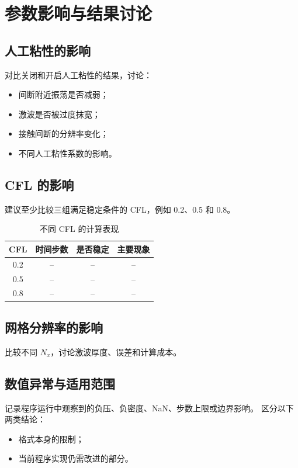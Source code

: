 \section{参数影响与结果讨论}

\subsection{人工粘性的影响}

对比关闭和开启人工粘性的结果，讨论：

\begin{itemize}[leftmargin=2em]
    \item 间断附近振荡是否减弱；
    \item 激波是否被过度抹宽；
    \item 接触间断的分辨率变化；
    \item 不同人工粘性系数的影响。
\end{itemize}


\subsection{CFL 的影响}

建议至少比较三组满足稳定条件的 CFL，例如 0.2、0.5 和 0.8。

\begin{table}[H]
    \centering
    \caption{不同 CFL 的计算表现}
    \label{tab:cfl}
    \begin{tabular}{cccc}
        \toprule
        CFL & 时间步数 & 是否稳定 & 主要现象\\
        \midrule
        0.2 & -- & -- & --\\
        0.5 & -- & -- & --\\
        0.8 & -- & -- & --\\
        \bottomrule
    \end{tabular}
\end{table}

\subsection{网格分辨率的影响}

比较不同 $N_x$，讨论激波厚度、误差和计算成本。


\subsection{数值异常与适用范围}

记录程序运行中观察到的负压、负密度、NaN、步数上限或边界影响。
区分以下两类结论：

\begin{itemize}[leftmargin=2em]
    \item 格式本身的限制；
    \item 当前程序实现仍需改进的部分。
\end{itemize}
